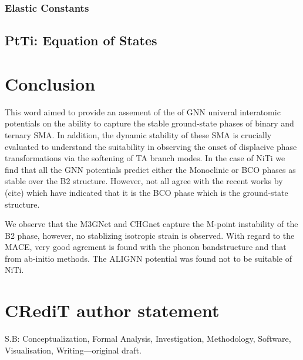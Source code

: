 \documentclass[preprint,colorlinks=true,linkcolor=black,citecolor=black]{elsarticle}
\begin{document}

\subsubsection{Elastic Constants}



\subsection{PtTi: Equation of States}
\label{sec:ptti_eos}



\section{Conclusion}
\label{sec:conclusion}
This word aimed to provide an assement of the of GNN univeral interatomic potentials on the ability to capture the stable ground-state phases of binary and ternary SMA. In addition, the dynamic stability of these SMA is crucially evaluated to understand the suitability in observing the onset of displacive phase transformations via the softening of TA branch modes. In the case of NiTi we find that all the GNN potentials predict either the Monoclinic or BCO phases as stable over the B2 structure. However, not all agree with the recent works by (cite) which have indicated that it is the BCO phase which is the ground-state structure.

We observe that the M3GNet and CHGnet capture the M-point instability of the B2 phase, however, no stablizing isotropic strain is observed. With regard to the MACE, very good agrement is found with the phonon bandstructure and that from ab-initio methods. The ALIGNN potential was found not to be suitable of NiTi.






\section*{CR\lowercase{e}d\lowercase{i}T author statement}

S.B: Conceptualization, Formal Analysis, Investigation, Methodology, Software, Visualisation, Writing---original draft.
\end{document}
